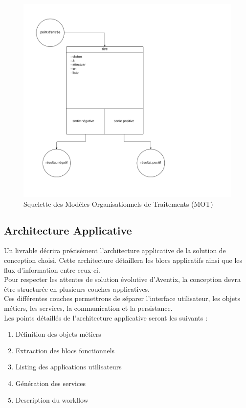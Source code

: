 \begin{figure}[ht]
    \centering
    \includegraphics[width=\textwidth]{mot-skeleton}
    \caption{Squelette des Modèles Organisationnels de Traitements (MOT)}
    \label{fig:mot-skeleton}
\end{figure}

\subsection{Architecture Applicative}
Un livrable décrira précisément l'architecture applicative de la solution de
conception choisi. Cette architecture détaillera les blocs applicatifs ainsi
que les flux d'information entre ceux-ci. \\

Pour respecter les attentes de solution évolutive d'Aventix, la conception
devra être structurée en plusieurs couches applicatives. \\

Ces différentes couches permettrons de séparer l'interface utilisateur, les
objets métiers, les services, la communication et la persistance. \\

Les points détaillés de l'architecture applicative seront les suivants :
\begin{enumerate}
  \item Définition des objets métiers
  \item Extraction des blocs fonctionnels
  \item Listing des applications utilisateurs
  \item Génération des services
  \item Description du workflow
\end{enumerate}

